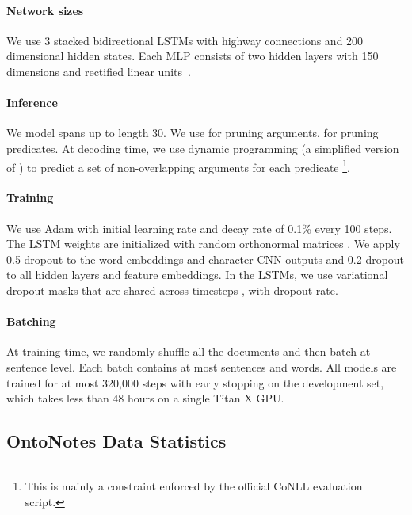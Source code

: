 \documentclass[11pt,a4paper]{article}
\begin{document}
\paragraph{Network sizes}
We use 3 stacked bidirectional LSTMs with highway connections and 200 dimensional hidden states. Each MLP consists of two hidden layers with 150 dimensions and rectified linear units~\cite{relu}.

\paragraph{Inference}
We model spans up to length 30. We use  for pruning arguments,  for pruning predicates. At decoding time, we use dynamic programming (a simplified version of ) to predict a set of non-overlapping arguments for each predicate \footnote{This is mainly a constraint enforced by the official CoNLL evaluation script.}.

\paragraph{Training}
We use Adam \cite{kingma:2016} with initial learning rate  and decay rate of 0.1\% every 100 steps. The LSTM weights are initialized with random orthonormal matrices \cite{saxe:2013}. We apply 0.5 dropout to the word embeddings and character CNN outputs and 0.2 dropout to all hidden layers and feature embeddings. In the LSTMs, we use variational dropout masks that are shared across timesteps  \cite{gal:2016}, with  dropout rate.

\paragraph{Batching}
At training time, we randomly shuffle all the documents and then batch at sentence level. Each batch contains at most  sentences and  words.
All models are trained for at most 320,000 steps with early stopping on the development set, which takes less than 48 hours on a single Titan X GPU. 


\subsection{OntoNotes Data Statistics}\label{sec:data_split}
\end{document}
